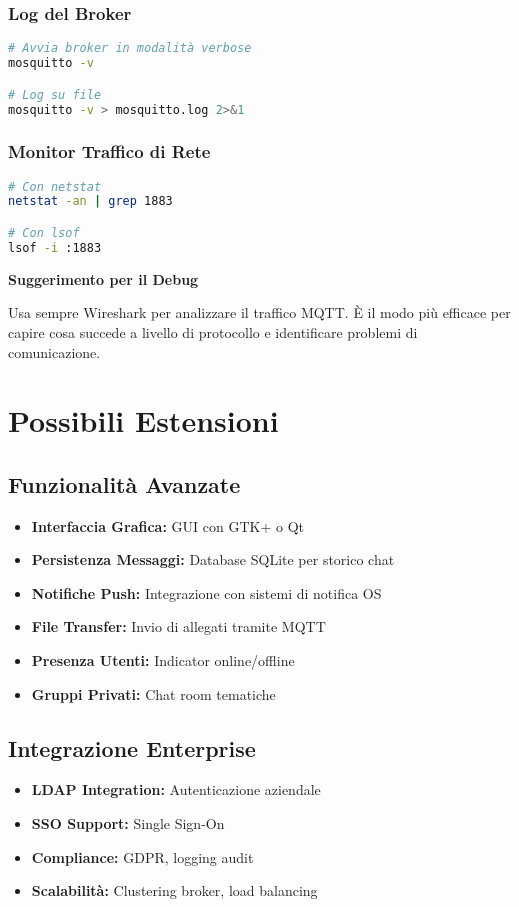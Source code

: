 \documentclass[12pt,a4paper]{article}
\begin{document}
\subsubsection{Log del Broker}
\begin{lstlisting}[language=bash]
# Avvia broker in modalità verbose
mosquitto -v

# Log su file  
mosquitto -v > mosquitto.log 2>&1
\end{lstlisting}

\subsubsection{Monitor Traffico di Rete}
\begin{lstlisting}[language=bash]
# Con netstat
netstat -an | grep 1883

# Con lsof
lsof -i :1883
\end{lstlisting}

\begin{infobox}
\textbf{Suggerimento per il Debug}

Usa sempre Wireshark per analizzare il traffico MQTT. È il modo più efficace per capire cosa succede a livello di protocollo e identificare problemi di comunicazione.
\end{infobox}

\section{Possibili Estensioni}

\subsection{Funzionalità Avanzate}
\begin{itemize}
    \item \textbf{Interfaccia Grafica:} GUI con GTK+ o Qt
    \item \textbf{Persistenza Messaggi:} Database SQLite per storico chat
    \item \textbf{Notifiche Push:} Integrazione con sistemi di notifica OS
    \item \textbf{File Transfer:} Invio di allegati tramite MQTT
    \item \textbf{Presenza Utenti:} Indicator online/offline
    \item \textbf{Gruppi Privati:} Chat room tematiche
\end{itemize}

\subsection{Integrazione Enterprise}
\begin{itemize}
    \item \textbf{LDAP Integration:} Autenticazione aziendale
    \item \textbf{SSO Support:} Single Sign-On
    \item \textbf{Compliance:} GDPR, logging audit
    \item \textbf{Scalabilità:} Clustering broker, load balancing
\end{itemize}
\end{document}
